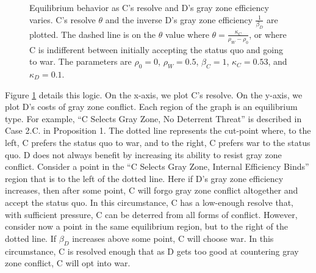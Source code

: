 \documentclass[11pt,letterpaper,pdftex,dvipsnames,table]{article}
\begin{document}
\begin{figure}[h]
    
    \caption{Equilibrium behavior as C's resolve and D's gray zone efficiency varies. C's resolve $\theta$ and the inverse D's gray zone efficiency $\frac{1}{\beta_D}$ are plotted. The dashed line is on the $\theta$ value where $\theta=\frac{\kappa_{C}}{\rho_W-\rho_0}$, or where C is indifferent between initially accepting the status quo and going to war. The parameters are $\rho_0=0$, $\rho_W=0.5$, $\beta_C=1$, $\kappa_{C}=0.53$, and $\kappa_D=0.1$.}
    \label{fig:equilibrium}
    \end{figure}

Figure \ref{fig:equilibrium} details this logic. On the x-axis, we plot C's resolve. On the y-axis, we plot D's costs of gray zone conflict. Each region of the graph is an equilibrium type. For example, ``C Selects Gray Zone, No Deterrent Threat'' is described in Case 2.C. in Proposition 1. The dotted line represents the cut-point where, to the left, C prefers the status quo to war, and to the right, C prefers war to the status quo. D does not always benefit by increasing its ability to resist gray zone conflict. Consider a point in the ``C Selects Gray Zone, Internal Efficiency Binds'' region that is to the left of the dotted line. Here if D's gray zone efficiency increases, then after some point, C will forgo gray zone conflict altogether and accept the status quo. In this circumstance, C has a low-enough resolve that, with sufficient pressure, C can be deterred from all forms of conflict. However, consider now a point in the same equilibrium region, but to the right of the dotted line. If $\beta_{D}$ increases above some point, C will choose war. In this circumstance, C is resolved enough that as D gets too good at countering gray zone conflict, C will opt into war. 
\end{document}
